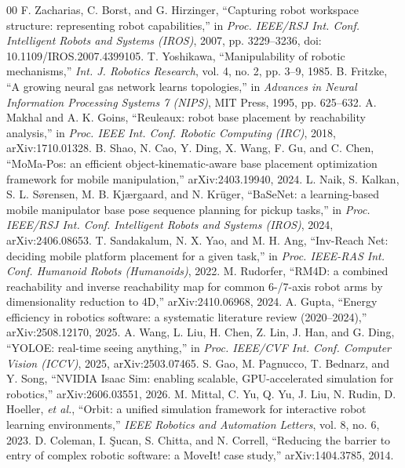 \documentclass[conference]{IEEEtran}
\begin{document}
\begin{thebibliography}{00}
 F. Zacharias, C. Borst, and G. Hirzinger, ``Capturing robot workspace structure: representing robot capabilities,'' in \textit{Proc. IEEE/RSJ Int. Conf. Intelligent Robots and Systems (IROS)}, 2007, pp. 3229--3236, doi: 10.1109/IROS.2007.4399105.
 T. Yoshikawa, ``Manipulability of robotic mechanisms,'' \textit{Int. J. Robotics Research}, vol. 4, no. 2, pp. 3--9, 1985.
 B. Fritzke, ``A growing neural gas network learns topologies,'' in \textit{Advances in Neural Information Processing Systems 7 (NIPS)}, MIT Press, 1995, pp. 625--632.
 A. Makhal and A. K. Goins, ``Reuleaux: robot base placement by reachability analysis,'' in \textit{Proc. IEEE Int. Conf. Robotic Computing (IRC)}, 2018, arXiv:1710.01328.
 B. Shao, N. Cao, Y. Ding, X. Wang, F. Gu, and C. Chen, ``MoMa-Pos: an efficient object-kinematic-aware base placement optimization framework for mobile manipulation,'' arXiv:2403.19940, 2024.
 L. Naik, S. Kalkan, S. L. S{\o}rensen, M. B. Kj{\ae}rgaard, and N. Kr{\"u}ger, ``BaSeNet: a learning-based mobile manipulator base pose sequence planning for pickup tasks,'' in \textit{Proc. IEEE/RSJ Int. Conf. Intelligent Robots and Systems (IROS)}, 2024, arXiv:2406.08653.
 T. Sandakalum, N. X. Yao, and M. H. Ang, ``Inv-Reach Net: deciding mobile platform placement for a given task,'' in \textit{Proc. IEEE-RAS Int. Conf. Humanoid Robots (Humanoids)}, 2022.
 M. Rudorfer, ``RM4D: a combined reachability and inverse reachability map for common 6-/7-axis robot arms by dimensionality reduction to 4D,'' arXiv:2410.06968, 2024.
 A. Gupta, ``Energy efficiency in robotics software: a systematic literature review (2020--2024),'' arXiv:2508.12170, 2025.
 A. Wang, L. Liu, H. Chen, Z. Lin, J. Han, and G. Ding, ``YOLOE: real-time seeing anything,'' in \textit{Proc. IEEE/CVF Int. Conf. Computer Vision (ICCV)}, 2025, arXiv:2503.07465.
 S. Gao, M. Pagnucco, T. Bednarz, and Y. Song, ``NVIDIA Isaac Sim: enabling scalable, GPU-accelerated simulation for robotics,'' arXiv:2606.03551, 2026.
 M. Mittal, C. Yu, Q. Yu, J. Liu, N. Rudin, D. Hoeller, \textit{et al.}, ``Orbit: a unified simulation framework for interactive robot learning environments,'' \textit{IEEE Robotics and Automation Letters}, vol. 8, no. 6, 2023.
 D. Coleman, I. {\c{S}}ucan, S. Chitta, and N. Correll, ``Reducing the barrier to entry of complex robotic software: a MoveIt! case study,'' arXiv:1404.3785, 2014.

\end{thebibliography}
\end{document}
